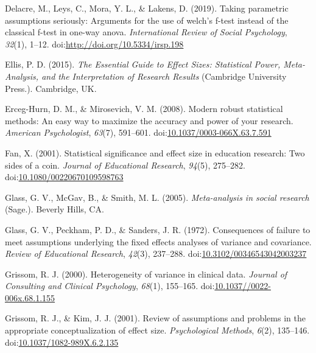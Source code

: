 \documentclass[
  man,floatsintext]{apa6}
\begin{document}
\leavevmode\hypertarget{ref-Delacre_et_al_2019}{}%
Delacre, M., Leys, C., Mora, Y. L., \& Lakens, D. (2019). Taking parametric assumptions seriously: Arguments for the use of welch's f-test instead of the classical f-test in one-way anova. \emph{International Review of Social Psychology}, \emph{32}(1), 1--12. doi:\href{https://doi.org/http://doi.org/10.5334/irsp.198}{http://doi.org/10.5334/irsp.198}

\leavevmode\hypertarget{ref-Ellis_2015}{}%
Ellis, P. D. (2015). \emph{The Essential Guide to Effect Sizes: Statistical Power, Meta-Analysis, and the Interpretation of Research Results} (Cambridge University Press.). Cambridge, UK.

\leavevmode\hypertarget{ref-Erceg-Hurn_Mirosevich_2008}{}%
Erceg-Hurn, D. M., \& Mirosevich, V. M. (2008). Modern robust statistical methods: An easy way to maximize the accuracy and power of your research. \emph{American Psychologist}, \emph{63}(7), 591--601. doi:\href{https://doi.org/10.1037/0003-066X.63.7.591}{10.1037/0003-066X.63.7.591}

\leavevmode\hypertarget{ref-Fan_2001}{}%
Fan, X. (2001). Statistical significance and effect size in education research: Two sides of a coin. \emph{Journal of Educational Research}, \emph{94}(5), 275--282. doi:\href{https://doi.org/10.1080/00220670109598763}{10.1080/00220670109598763}

\leavevmode\hypertarget{ref-Glass_et_al_1981}{}%
Glass, G. V., McGav, B., \& Smith, M. L. (2005). \emph{Meta-analysis in social research} (Sage.). Beverly Hills, CA.

\leavevmode\hypertarget{ref-Glass_et_al_1972}{}%
Glass, G. V., Peckham, P. D., \& Sanders, J. R. (1972). Consequences of failure to meet assumptions underlying the fixed effects analyses of variance and covariance. \emph{Review of Educational Research}, \emph{42}(3), 237--288. doi:\href{https://doi.org/10.3102/00346543042003237}{10.3102/00346543042003237}

\leavevmode\hypertarget{ref-Grissom_2000}{}%
Grissom, R. J. (2000). Heterogeneity of variance in clinical data. \emph{Journal of Consulting and Clinical Psychology}, \emph{68}(1), 155--165. doi:\href{https://doi.org/10.1037//0022-006x.68.1.155}{10.1037//0022-006x.68.1.155}

\leavevmode\hypertarget{ref-Grissom_Kim_2001}{}%
Grissom, R. J., \& Kim, J. J. (2001). Review of assumptions and problems in the appropriate conceptualization of effect size. \emph{Psychological Methods}, \emph{6}(2), 135--146. doi:\href{https://doi.org/10.1037/1082-989X.6.2.135}{10.1037/1082-989X.6.2.135}
\end{document}
